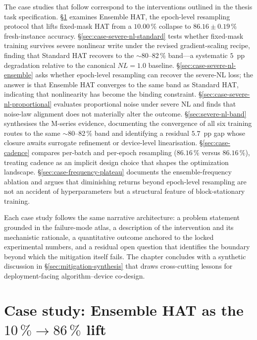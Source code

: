 The case studies that follow correspond to the interventions outlined in the thesis task specification. \S\ref{sec:case-ensemble-hat} examines Ensemble HAT, the epoch-level resampling protocol that lifts fixed-mask HAT from a $10.00\,\%$ collapse to $86.16\pm0.19\,\%$ fresh-instance accuracy. \S\ref{sec:case-severe-nl-standard} tests whether fixed-mask training survives severe nonlinear write under the revised gradient-scaling recipe, finding that Standard HAT recovers to the $\sim$80--82\,\% band---a systematic $5$~pp degradation relative to the canonical $NL=1.0$ baseline. \S\ref{sec:case-severe-nl-ensemble} asks whether epoch-level resampling can recover the severe-NL loss; the answer is that Ensemble HAT converges to the same band as Standard HAT, indicating that nonlinearity has become the binding constraint. \S\ref{sec:case-severe-nl-proportional} evaluates proportional noise under severe NL and finds that noise-law alignment does not materially alter the outcome. \S\ref{sec:severe-nl-band} synthesises the M-series evidence, documenting the convergence of all six training routes to the same $\sim$80--82\,\% band and identifying a residual $5.7$~pp gap whose closure awaits surrogate refinement or device-level linearisation. \S\ref{sec:case-cadence} compares per-batch and per-epoch resampling ($86.16\,\%$ versus $86.16\,\%$), treating cadence as an implicit design choice that shapes the optimization landscape. \S\ref{sec:case-frequency-plateau} documents the ensemble-frequency ablation and argues that diminishing returns beyond epoch-level resampling are not an accident of hyperparameters but a structural feature of block-stationary training.

Each case study follows the same narrative architecture: a problem statement grounded in the failure-mode atlas, a description of the intervention and its mechanistic rationale, a quantitative outcome anchored to the locked experimental numbers, and a residual open question that identifies the boundary beyond which the mitigation itself fails. The chapter concludes with a synthetic discussion in \S\ref{sec:mitigation-synthesis} that draws cross-cutting lessons for deployment-facing algorithm--device co-design.


\section{Case study: Ensemble HAT as the \texorpdfstring{$10\,\%\rightarrow86\,\%$}{10\,\%→86\,\%} lift}
\label{sec:case-ensemble-hat}

